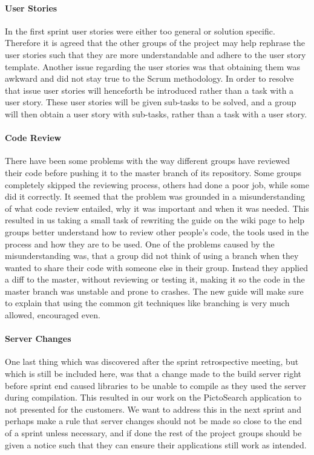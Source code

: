 \paragraph{User Stories} In the first sprint user stories were either too general or solution specific.
Therefore it is agreed that the other groups of the project may help rephrase the user stories such that they are more understandable and adhere to the user story template.
Another issue regarding the user stories was that obtaining them was awkward and did not stay true to the Scrum methodology.
In order to resolve that issue user stories will henceforth be introduced rather than a task with a user story.
These user stories will be given sub-tasks to be solved, and a group will then obtain a user story with sub-tasks, rather than a task with a user story.

\paragraph{Code Review}
There have been some problems with the way different groups have reviewed their code before pushing it to the master branch of its repository.
Some groups completely skipped the reviewing process, others had done a poor job, while some did it correctly.
It seemed that the problem was grounded in a misunderstanding of what code review entailed, why it was important and when it was needed.
This resulted in us taking a small task of rewriting the guide on the wiki page to help groups better understand how to review other people's code, the tools used in the process and how they are to be used.
One of the problems caused by the misunderstanding was, that a group did not think of using a branch when they wanted to share their code with someone else in their group.
Instead they applied a diff to the master, without reviewing or testing it, making it so the code in the master branch was unstable and prone to crashes.
The new guide will make sure to explain that using the common git techniques like branching is very much allowed, encouraged even.

\paragraph{Server Changes}
One last thing which was discovered after the sprint retrospective meeting, but which is still be included here, was that a change made to the build server right before sprint end caused libraries to be unable to compile as they used the server during compilation.
This resulted in our work on the PictoSearch application to not presented for the customers.
We want to address this in the next sprint and perhaps make a rule that server changes should not be made so close to the end of a sprint unless necessary, and if done the rest of the project groups should be given a notice such that they can ensure their applications still work as intended.

